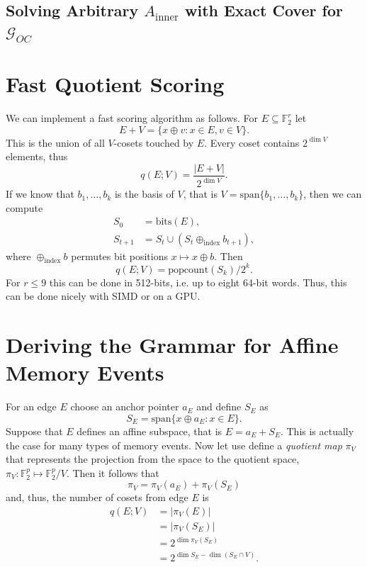 \documentclass[10pt]{article}
\theoremstyle{remark}
\begin{document}



\subsection{Solving Arbitrary $A_{\text{inner}}$ with Exact Cover for $\mathcal{G}_{OC}$}



\appendix

\section{Fast Quotient Scoring}
We can implement a fast scoring algorithm as follows. For $E\subseteq \mathbb{F}_2^r$ let
%
\[
E+V = \{ x\oplus v : x \in E, v \in V \}.
\]
%
This is the union of all $V$-cosets touched by $E$. Every coset contains $2^{\dim V}$ elements, thus
%
\[
q(E; V) = \frac{|E+V|}{2^{\dim V}}.
\]
%
If we know that $b_1,\ldots,b_k$ is the basis of $V$, that is $V=\text{span}\{b_1,\ldots,b_k\}$, then we can compute
%
\[
\begin{aligned}
    S_0 &= \text{bits}(E), \\
    S_{t+1} &= S_t \cup \left( S_t \oplus_{\text{index}} b_{t+1} \right),
\end{aligned}
\]
%
where $\oplus_\text{index}b$ permutes bit positions $x\mapsto x \oplus b$. Then
%
\[
    q(E; V) = \text{popcount}(S_k) / 2^k.
\]
%
For $r\le 9$ this can be done in 512-bits, i.e. up to eight 64-bit words. Thus, this can be done nicely with SIMD or on a GPU.

\section{Deriving the Grammar for Affine Memory Events}

For an edge $E$ choose an anchor pointer $a_E$ and define $S_E$ as
%
\[
    S_E = \text{span}\{x \oplus a_E : x \in E\}.
\]
%
Suppose that $E$ defines an affine subspace, that is $E=a_E + S_E$. This is actually the case for many types of memory events. Now let use define a {\it quotient map} $\pi_V$ that represents the projection from the space to the quotient space, $\pi_V : \mathbb{F}_2^p \mapsto \mathbb{F}_2^p / V$. Then it follows that
%
\[
    \pi_V = \pi_V(a_E) + \pi_V(S_E)
\]
%
and, thus, the number of cosets from edge $E$ is
%
\[
    \begin{aligned}
        q(E;V) &= |\pi_V(E)| \\
        &= |\pi_V(S_E)| \\
        &= 2^{\dim \pi_V(S_E)} \\
        &= 2^{\dim S_E - \dim(S_E\cap V)}.
    \end{aligned}
\]
\end{document}
